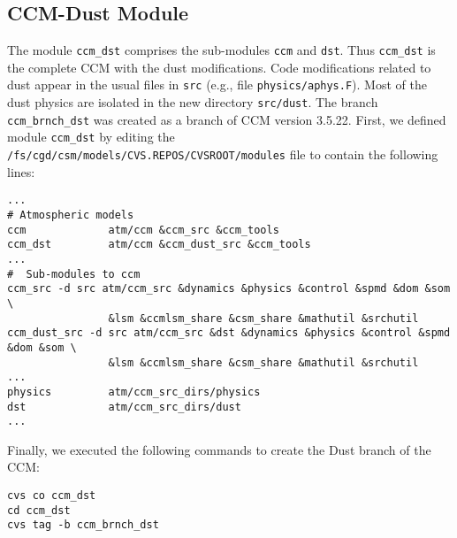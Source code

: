 \documentclass[12pt,twoside]{article}
\begin{document}
\subsection{CCM-Dust Module}\label{sxn:cvs_ccm_dst}
The module \verb'ccm_dst' comprises the sub-modules \verb'ccm' and
\verb'dst'. 
Thus \verb'ccm_dst' is the complete CCM with the dust modifications. 
Code modifications related to dust appear in the usual files in
\verb'src' (e.g., file \verb'physics/aphys.F'). 
Most of the dust physics are isolated in the new directory
\verb'src/dust'.  
The branch \verb'ccm_brnch_dst' was created as a branch of CCM version
3.5.22.
First, we defined module \verb'ccm_dst' by editing the
\verb'/fs/cgd/csm/models/CVS.REPOS/CVSROOT/modules' file to contain
the following lines: 
\begin{verbatim}
...
# Atmospheric models
ccm             atm/ccm &ccm_src &ccm_tools
ccm_dst         atm/ccm &ccm_dust_src &ccm_tools
...
#  Sub-modules to ccm
ccm_src -d src atm/ccm_src &dynamics &physics &control &spmd &dom &som \
                &lsm &ccmlsm_share &csm_share &mathutil &srchutil
ccm_dust_src -d src atm/ccm_src &dst &dynamics &physics &control &spmd &dom &som \
                &lsm &ccmlsm_share &csm_share &mathutil &srchutil
...
physics         atm/ccm_src_dirs/physics
dst             atm/ccm_src_dirs/dust
...
\end{verbatim}
Finally, we executed the following commands to create the Dust branch
of the CCM:
\begin{verbatim}
cvs co ccm_dst
cd ccm_dst
cvs tag -b ccm_brnch_dst
\end{verbatim}
\end{document}
